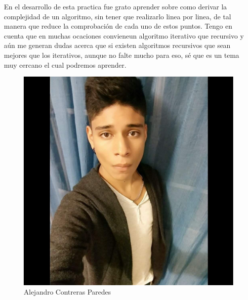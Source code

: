 \documentclass[12pt,twoside]{article}
\begin{document}
En el desarrollo de esta practica fue grato aprender sobre como derivar la complejidad de un algoritmo, sin tener
que realizarlo linea por linea, de tal manera que reduce la comprobaci\'on de cada uno de estos puntos. Tengo en 
cuenta que en muchas ocaciones convieneun algoritmo iterativo que recursivo y a\'un me generan dudas acerca que si
existen algoritmos recursivos que sean mejores que los iterativos, aunque no falte mucho para eso, s\'e que es un
tema muy cercano el cual podremos aprender.
\begin{figure}[!h]
	\centering
	\begin{minipage}[t]{10cm}
		\centering
		\includegraphics[scale=0.2]{Foto1}
		\caption{Alejandro Contreras Paredes}
	\end{minipage}
	\hspace{18cm}
	\begin{minipage}[t]{10cm}
		\centering

\end{minipage}
\end{figure}
\end{document}

